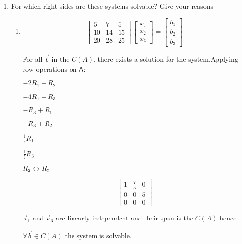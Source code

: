 \documentclass[a4paper, 11pt]{article}
\newcommand{\mat}[1]{\boldsymbol { \mathsf{#1}} }
\begin{document}
\begin{enumerate}
\item For which right sides are these systems solvable? Give your reasons
\begin{enumerate}
\item
\[ 
\left[ \begin{array}{ccc}
5  &   7 &  5\\
10  &   14 &  15\\
20 & 28 & 25
\end{array} \right]
%
\left[ \begin{array}{c}
 x_1\\
 x_2\\
x_3 
\end{array} \right]
%
= \left[ \begin{array}{c}
 b_1\\
 b_2\\
 b_3 
\end{array} \right]
\]

For all $\vec b$ in the $C(A)$, there exists a solution for the system.Applying row operations on $\mat A$: 

\begin{center}
$-2R_1 + R_2$

$-4R_1 + R_3$

$-R_3 + R_1$

$-R_3 + R_2$

$\frac{1}{5} R_1$

$\frac{1}{5} R_3$

$ R_2 \leftrightarrow R_3$
\end{center}


\[ 
\left[ \begin{array}{ccc}
1  & \frac{7}{5} &  0\\
0  &   0 &  5\\
0 & 0 & 0
\end{array} \right]
\]

$\vec a_1$ and $\vec a_3$ are linearly independent and their span is the $C(A)$ hence 

$\forall \vec b \in C(A)$  the system is solvable.



\end{enumerate}
\end{enumerate}
\end{document}
